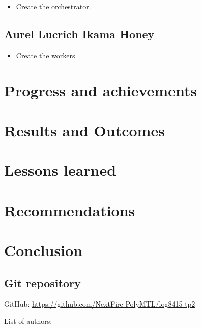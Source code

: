 \documentclass[letterpaper,headings=standardclasses,parskip=half]{scrartcl}
\newcommand{\todo}{{\color{red}{TODO}}}
\begin{document}
\begin{itemize}
    \item Create the orchestrator.
\end{itemize}

\subsection*{Aurel Lucrich Ikama Honey}

\begin{itemize}
    \item Create the workers.
\end{itemize}

\section{Progress and achievements}

\todo

\section{Results and Outcomes}

\todo

\section{Lessons learned}

\todo

\section{Recommendations}

\todo

\section{Conclusion}

\todo


\subsection*{Git repository}

GitHub: \url{https://github.com/NextFire-PolyMTL/log8415-tp2}

List of authors:
\end{document}
